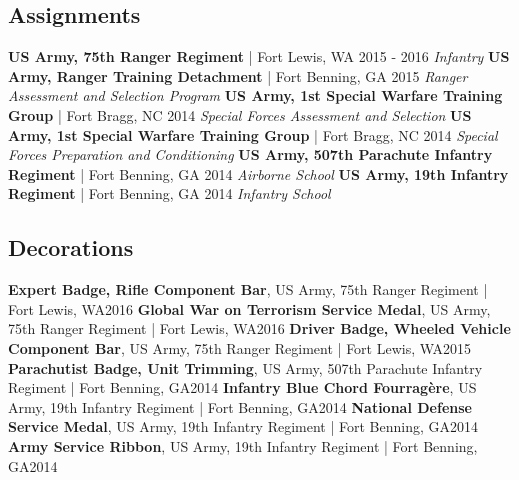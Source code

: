 \documentclass{article}
\begin{document}
    \subsection*{Assignments}
        \textbf{US Army, 75th Ranger Regiment} | Fort Lewis, WA \hfill{2015 - 2016}\newline
        \textit{Infantry}\newline\newline
        \textbf{US Army, Ranger Training Detachment} | Fort Benning, GA \hfill{2015}\newline
        \textit{Ranger Assessment and Selection Program}\newline\newline
        \textbf{US Army, 1st Special Warfare Training Group} | Fort Bragg, NC \hfill{2014}\newline
        \textit{Special Forces Assessment and Selection}\newline\newline
        \textbf{US Army, 1st Special Warfare Training Group} | Fort Bragg, NC \hfill{2014}\newline
        \textit{Special Forces Preparation and Conditioning}\newline\newline
        \textbf{US Army, 507th Parachute Infantry Regiment} | Fort Benning, GA \hfill{2014}\newline
        \textit{Airborne School}\newline\newline
        \textbf{US Army, 19th Infantry Regiment} | Fort Benning, GA \hfill{2014}\newline
        \textit{Infantry School}
    \subsection*{Decorations}
        \textbf{Expert Badge, Rifle Component Bar}, US Army, 75th Ranger Regiment | Fort Lewis, WA\hfill{2016}\newline
        \textbf{Global War on Terrorism Service Medal}, US Army, 75th Ranger Regiment | Fort Lewis, WA\hfill{2016}\newline
        \textbf{Driver Badge, Wheeled Vehicle Component Bar}, US Army, 75th Ranger Regiment | Fort Lewis, WA\hfill{2015}\newline
        \textbf{Parachutist Badge, Unit Trimming}, US Army, 507th Parachute Infantry Regiment | Fort Benning, GA\hfill{2014}\newline
        \textbf{Infantry Blue Chord Fourragère}, US Army, 19th Infantry Regiment | Fort Benning, GA\hfill{2014}\newline
        \textbf{National Defense Service Medal}, US Army, 19th Infantry Regiment | Fort Benning, GA\hfill{2014}\newline
        \textbf{Army Service Ribbon}, US Army, 19th Infantry Regiment | Fort Benning, GA\hfill{2014}
\end{document}
